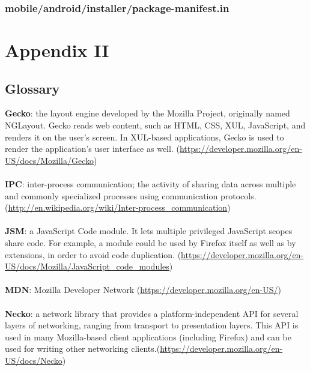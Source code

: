 \documentclass[12pt]{article}
\begin{document}
\subsubsection{mobile/android/installer/package-manifest.in}

\pagebreak

\section{Appendix II}
\subsection{Glossary}
\textbf{Gecko}: the layout engine developed by the Mozilla Project, originally named NGLayout. Gecko reads web content, such as HTML, CSS, XUL, JavaScript, and renders it on the user's screen. In XUL-based applications, Gecko is used to render the application's user interface as well. (\href{https://developer.mozilla.org/en-US/docs/Mozilla/Gecko}{https://developer.mozilla.org/en-US/docs/Mozilla/Gecko})
\\\\
\textbf{IPC}: inter-process communication; the activity of sharing data across multiple and commonly specialized processes using communication protocols. (\href{http://en.wikipedia.org/wiki/Inter-process_communication}{http://en.wikipedia.org/wiki/Inter-process\_communication})
\\\\
\textbf{JSM}: a JavaScript Code module. It lets multiple privileged JavaScript scopes share code. For example, a module could be used by Firefox itself as well as by extensions, in order to avoid code duplication. (\href{https://developer.mozilla.org/en-US/docs/Mozilla/JavaScript_code_modules}{https://developer.mozilla.org/en-US/docs/Mozilla/JavaScript\_code\_modules})
\\\\
\textbf{MDN}: Mozilla Developer Network (\href{https://developer.mozilla.org/en-US/}{https://developer.mozilla.org/en-US/})
\\\\
\textbf{Necko}: a network library that provides a platform-independent API for several layers of networking, ranging from transport to presentation layers. This API is used in many Mozilla-based client applications (including Firefox) and can be used for writing other networking clients.(\href{https://developer.mozilla.org/en-US/docs/Necko}{https://developer.mozilla.org/en-US/docs/Necko})
\end{document}
